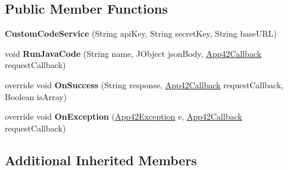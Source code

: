 \subsection*{Public Member Functions}
\begin{DoxyCompactItemize}
\item 
\hypertarget{classcom_1_1shephertz_1_1app42_1_1paas_1_1sdk_1_1windows_1_1customcode_1_1_custom_code_service_aadc9d4035fa8ddad743963a900993071}{{\bfseries Custom\+Code\+Service} (String api\+Key, String secret\+Key, String base\+U\+R\+L)}\label{classcom_1_1shephertz_1_1app42_1_1paas_1_1sdk_1_1windows_1_1customcode_1_1_custom_code_service_aadc9d4035fa8ddad743963a900993071}

\item 
\hypertarget{classcom_1_1shephertz_1_1app42_1_1paas_1_1sdk_1_1windows_1_1customcode_1_1_custom_code_service_a9009856d99de73b9112fab04b56660ce}{void {\bfseries Run\+Java\+Code} (String name, J\+Object json\+Body, \hyperlink{interfacecom_1_1shephertz_1_1app42_1_1paas_1_1sdk_1_1windows_1_1_app42_callback}{App42\+Callback} request\+Callback)}\label{classcom_1_1shephertz_1_1app42_1_1paas_1_1sdk_1_1windows_1_1customcode_1_1_custom_code_service_a9009856d99de73b9112fab04b56660ce}

\item 
\hypertarget{classcom_1_1shephertz_1_1app42_1_1paas_1_1sdk_1_1windows_1_1customcode_1_1_custom_code_service_a8b3a44fe621ba5e4cf0d85391f0e5bcd}{override void {\bfseries On\+Success} (String response, \hyperlink{interfacecom_1_1shephertz_1_1app42_1_1paas_1_1sdk_1_1windows_1_1_app42_callback}{App42\+Callback} request\+Callback, Boolean is\+Array)}\label{classcom_1_1shephertz_1_1app42_1_1paas_1_1sdk_1_1windows_1_1customcode_1_1_custom_code_service_a8b3a44fe621ba5e4cf0d85391f0e5bcd}

\item 
\hypertarget{classcom_1_1shephertz_1_1app42_1_1paas_1_1sdk_1_1windows_1_1customcode_1_1_custom_code_service_acf2e5cbbdd7dc8c0cc33dbd31b5a11f2}{override void {\bfseries On\+Exception} (\hyperlink{classcom_1_1shephertz_1_1app42_1_1paas_1_1sdk_1_1windows_1_1_app42_exception}{App42\+Exception} e, \hyperlink{interfacecom_1_1shephertz_1_1app42_1_1paas_1_1sdk_1_1windows_1_1_app42_callback}{App42\+Callback} request\+Callback)}\label{classcom_1_1shephertz_1_1app42_1_1paas_1_1sdk_1_1windows_1_1customcode_1_1_custom_code_service_acf2e5cbbdd7dc8c0cc33dbd31b5a11f2}

\end{DoxyCompactItemize}
\subsection*{Additional Inherited Members}
